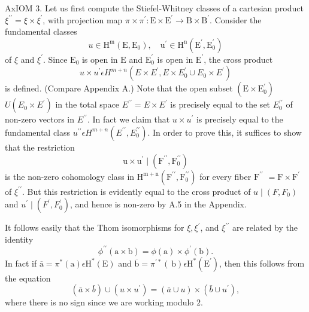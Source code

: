 \documentclass[10pt]{article}
\begin{document}
AxIOM 3. Let us first compute the Stiefel-Whitney classes of a cartesian product $\xi^{\prime \prime}=\xi \times \xi^{\prime}$, with projection map $\pi \times \pi^{\prime}: \mathrm{E} \times \mathrm{E}^{\prime} \rightarrow \mathrm{B} \times \mathrm{B}^{\prime}$. Consider the fundamental classes
$$
u \in \mathrm{H}^{\mathrm{m}}\left(\mathrm{E}, \mathrm{E}_{0}\right), \quad \mathrm{u}^{\prime} \in \mathrm{H}^{\mathrm{n}}\left(\mathrm{E}^{\prime}, \mathrm{E}_{0}^{\prime}\right)
$$
of $\xi$ and $\xi^{\prime}$. Since $\mathrm{E}_{0}$ is open in $\mathrm{E}$ and $\mathrm{E}_{0}^{\prime}$ is open in $\mathrm{E}^{\prime}$, the cross product
$$
u \times u^{\prime} \epsilon H^{m+n}\left(E \times E^{\prime}, E \times E_{0}^{\prime} \cup E_{0} \times E^{\prime}\right)
$$
is defined. (Compare Appendix A.) Note that the open subset $\left(\mathrm{E} \times \mathrm{E}_{0}^{\prime}\right)$ $U\left(E_{0} \times E^{\prime}\right)$ in the total space $E^{\prime \prime}=E \times E^{\prime}$ is precisely equal to the set $E_{0}^{\prime \prime}$ of non-zero vectors in $E^{\prime \prime}$. In fact we claim that $u \times u^{\prime}$ is precisely equal to the fundamental class $u^{\prime \prime} \epsilon H^{m+n}\left(E^{\prime \prime}, E_{0}^{\prime \prime}\right)$. In order to prove this, it suffices to show that the restriction
$$
\mathrm{u} \times \mathrm{u}^{\prime} \mid\left(\mathrm{F}^{\prime \prime}, \mathrm{F}_{0}^{\prime \prime}\right)
$$
is the non-zero cohomology class in $\mathrm{H}^{\mathrm{m}+\mathrm{n}}\left(\mathrm{F}^{\prime \prime}, \mathrm{F}_{0}^{\prime \prime}\right)$ for every fiber $\mathrm{F}^{\prime \prime}$ $=\mathrm{F} \times \mathrm{F}^{\prime}$ of $\xi^{\prime \prime}$. But this restriction is evidently equal to the cross product of $u \mid\left(F, F_{0}\right)$ and $u^{\prime} \mid\left(F^{\prime}, F_{0}^{\prime}\right)$, and hence is non-zero by A.5 in the Appendix.

It follows easily that the Thom isomorphisms for $\xi, \xi^{\prime}$, and $\xi^{\prime \prime}$ are related by the identity
$$
\phi^{\prime \prime}(\mathrm{a} \times \mathrm{b})=\phi(\mathrm{a}) \times \phi^{\prime}(\mathrm{b}) .
$$
In fact if $\overline{\mathrm{a}}=\pi^{*}(\mathrm{a}) \epsilon \mathrm{H}^{*}(\mathrm{E})$ and $\overline{\mathrm{b}}=\pi^{\prime *}(\mathrm{~b}) \epsilon \mathrm{H}^{*}\left(\mathrm{E}^{\prime}\right)$, then this follows from the equation
$$
(\bar{a} \times \bar{b}) \cup\left(u \times u^{\prime}\right)=(\bar{a} \cup u) \times\left(\bar{b} \cup u^{\prime}\right),
$$
where there is no sign since we are working modulo $2 .$
\end{document}
